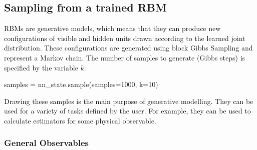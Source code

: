 \documentclass[submission, Phys]{SciPost}
\begin{document}
\subsection{Sampling from a trained RBM}
\label{Sec:Sampling_a-Trained_RBM}

RBMs are generative models, which means that they can produce new configurations of visible and hidden units
drawn according to the learned joint distribution.
These configurations are generated using block Gibbs Sampling and represent a Markov chain.
The number of samples to generate (Gibbs steps) is specified by the variable $k$:
\begin{python}
	samples = nn_state.sample(samples=1000, k=10)
\end{python}

Drawing these samples is the main purpose of generative modelling. 
They can be used for a variety of tasks defined by the user.
For example, they can be used to calculate estimators for some physical observable.

\subsubsection{General Observables}
\label{Sec:Observables}
\end{document}
